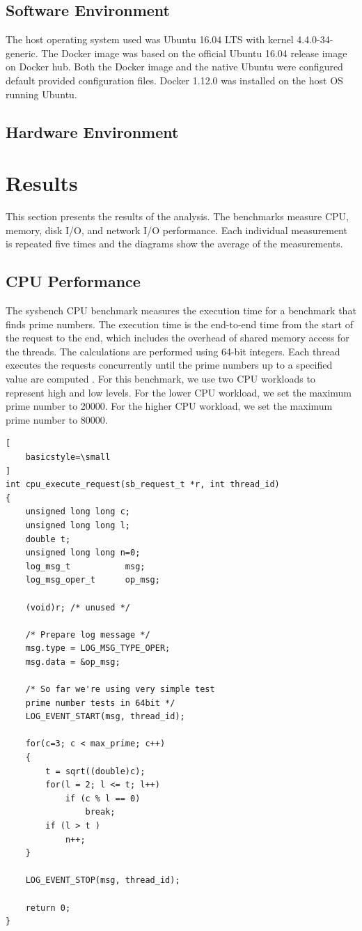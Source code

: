 \documentclass[11pt]{article}
\begin{document}
\subsection{Software Environment}
The host operating system used was Ubuntu 16.04 LTS with kernel 4.4.0-34-generic. 
The Docker image was based on the official Ubuntu 16.04 release image on Docker hub. 
Both the Docker image and the native Ubuntu were configured default provided configuration files. Docker 1.12.0 was installed on the host OS running Ubuntu. 

\subsection{Hardware Environment}


\section{Results}
This section presents the results of the analysis. The benchmarks measure CPU, memory, disk I/O, and network I/O performance. Each individual measurement is repeated five 
times and the diagrams show the average of the measurements. 

\subsection{CPU Performance}
The sysbench CPU benchmark measures the execution time for a benchmark that finds prime numbers. The execution time is the end-to-end time from the start of the request to the end, which includes the overhead of shared memory access for the threads. The calculations are performed using 64-bit integers. Each thread executes the requests concurrently until the prime numbers up to a specified value are computed \cite{kopytov}. For this benchmark, we use two CPU workloads to represent high and low levels. For the lower CPU workload, we set the maximum prime number to 20000. For the higher CPU workload, we set the maximum prime number to 80000. 

\lstset{caption=Sysbench CPU Benchmark Source Code, label=lst:sysbenchcpu}
\begin{lstlisting}[
	basicstyle=\small
]
int cpu_execute_request(sb_request_t *r, int thread_id)
{
	unsigned long long c;
	unsigned long long l;
	double t;
	unsigned long long n=0;
	log_msg_t           msg;
	log_msg_oper_t      op_msg;
	
	(void)r; /* unused */
	
	/* Prepare log message */
	msg.type = LOG_MSG_TYPE_OPER;
	msg.data = &op_msg;
	
	/* So far we're using very simple test 
	prime number tests in 64bit */
	LOG_EVENT_START(msg, thread_id);
	
	for(c=3; c < max_prime; c++)  
	{
		t = sqrt((double)c);
		for(l = 2; l <= t; l++)
			if (c % l == 0)
				break;
		if (l > t )
			n++; 
	}
	
	LOG_EVENT_STOP(msg, thread_id);
	
	return 0;
}
\end{lstlisting}
\end{document}
